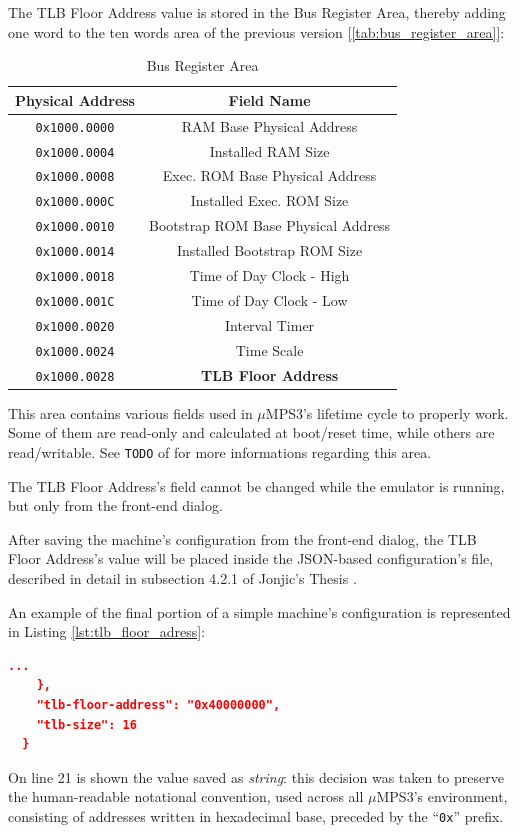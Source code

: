 \documentclass[12pt,a4paper,openright,twoside]{report}
\begin{document}
The TLB Floor Address value is stored in the Bus Register Area, thereby adding one word to the ten words area of the previous version [\autoref{tab:bus_register_area}]:
\begin{table}[h]
	\centering
	\begin{tabular}{|c|c|}
		\hline
		Physical Address     & Field Name                          \\ \hline\hline
		\texttt{0x1000.0000} & RAM Base Physical Address           \\ \hline
		\texttt{0x1000.0004} & Installed RAM Size                  \\ \hline
		\texttt{0x1000.0008} & Exec. ROM Base Physical Address     \\ \hline
		\texttt{0x1000.000C} & Installed Exec. ROM Size            \\ \hline
		\texttt{0x1000.0010} & Bootstrap ROM Base Physical Address \\ \hline
		\texttt{0x1000.0014} & Installed Bootstrap ROM Size        \\ \hline
		\texttt{0x1000.0018} & Time of Day Clock - High            \\ \hline
		\texttt{0x1000.001C} & Time of Day Clock - Low             \\ \hline
		\texttt{0x1000.0020} & Interval Timer                      \\ \hline
		\texttt{0x1000.0024} & Time Scale                          \\ \hline
		\texttt{0x1000.0028} & \textbf{TLB Floor Address}          \\ \hline
	\end{tabular}
	\caption{Bus Register Area}
	\label{tab:bus_register_area}
\end{table}

This area contains various fields used in $\mu$MPS3's lifetime cycle to properly work.
Some of them are read-only and calculated at boot/reset time, while others are read/writable.
See \texttt{TODO} of \cite{pops} for more informations regarding this area.

The TLB Floor Address's field cannot be changed while the emulator is running, but only from the front-end dialog.

After saving the machine's configuration from the front-end dialog, the TLB Floor Address's value will be placed inside the JSON-based configuration's file, described in detail in subsection 4.2.1 of Jonjic's Thesis \cite{tjonjic}.

An example of the final portion of a simple machine's configuration is represented in Listing \ref{lst:tlb_floor_adress}:
\begin{lstlisting}[language=json,firstnumber=19,caption={TLB Floor Address},captionpos=b,label={lst:tlb_floor_adress}]
    ...
    },
    "tlb-floor-address": "0x40000000",
    "tlb-size": 16
  }
  \end{lstlisting}
On line 21 is shown the value saved as \textit{string}: this decision was taken to preserve the human-readable notational convention, used across all $\mu$MPS3's environment, consisting of addresses written in hexadecimal base, preceded by the ``\texttt{0x}'' prefix.
\end{document}
